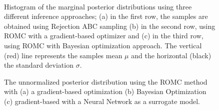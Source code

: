\documentclass[article]{jss}
\begin{document}
\begin{figure}[ht]
  \begin{center}
    \resizebox{.24\columnwidth}{!}{%
      
    }
    \resizebox{.24\columnwidth}{!}{%
      
    }
    \resizebox{.24\columnwidth}{!}{%
      
    }
    \resizebox{.24\columnwidth}{!}{%
      
    }\\
    \resizebox{.24\columnwidth}{!}{%
      
    }
    \resizebox{.24\columnwidth}{!}{%
      
    }
    \resizebox{.24\columnwidth}{!}{%
      
    }
    \resizebox{.24\columnwidth}{!}{%
      
    }
    \end{center}
    \caption[MA2 example, evaluation of the marginal
    distributions.]{Histogram of the marginal posterior distributions
      using three different inference approaches; (a) in the first
      row, the samples are obtained using Rejection ABC sampling (b)
      in the second row, using ROMC with a gradient-based optimizer
      and (c) in the third row, using ROMC with Bayesian optimization
      approach. The vertical (red) line represents the samples mean
      \(\mu\) and the horizontal (black) the standard deviation
      \(\sigma\).}
  \label{fig:ma2_3}
\end{figure}

\begin{figure}[ht]
  \begin{center}
    \resizebox{.32\columnwidth}{!}{%
      
    }
    \resizebox{.32\columnwidth}{!}{%
      
    }
    \resizebox{.32\columnwidth}{!}{%
      
    }
    \end{center}
    \caption[MA2 example, posterior distribution.]{The unnormalized posterior distribution using the ROMC method with (a) a gradient-based optimization (b) Bayesian Optimization (c) gradient-based with a Neural Network as a surrogate model.}
  \label{fig:ma2_4}
\end{figure}
\end{document}
